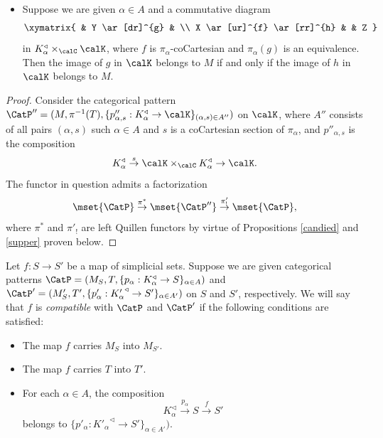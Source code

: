 \begin{theorem}
\begin{itemize}
\item[$(8)$] Suppose we are given $\alpha \in A$ and a commutative diagram
$$ \xymatrix{ & Y \ar[dr]^{g} & \\
X \ar[ur]^{f} \ar[rr]^{h} & & Z }$$
in $K_{\alpha}^{\triangleleft} \times_{\calC} \calK$, where
$f$ is $\pi_{\alpha}$-coCartesian and $\pi_{\alpha}(g)$ is an equivalence. Then the image of $g$ in $\calK$ belongs to $M$
if and only if the image of $h$ in $\calK$ belongs to $M$.
\end{itemize}
\end{theorem}

\begin{proof}
Consider the categorical pattern
$\CatP'' = (M, \pi^{-1}(T), \{ p''_{\alpha,s}: K_{\alpha}^{\triangleleft} \rightarrow \calK\}_{(\alpha,s) \in A''})$
on $\calK$, where $A''$ consists of all pairs $(\alpha, s)$ such $\alpha \in A$ and
$s$ is a coCartesian section of $\pi_{\alpha}$, and $p''_{\alpha,s}$ is the composition
$$K_{\alpha}^{\triangleleft} \stackrel{s}{\rightarrow} \calK \times_{ \calC} K_{\alpha}^{\triangleleft} \rightarrow \calK.$$
The functor in question admits a factorization
$$ \mset{\CatP} \stackrel{ \pi^{\ast}}{\rightarrow} \mset{\CatP''} \stackrel{ \pi'_{!} }{\rightarrow} \mset{\CatP},$$
where $\pi^{\ast}$ and $\pi'_{!}$ are left Quillen functors by virtue of Propositions \ref{candied} and \ref{supper} proven below.
\end{proof}

\begin{definition}
Let $f: S \rightarrow S'$ be a map of simplicial sets. Suppose we are given categorical patterns
$\CatP = (M_S, T, \{ p_{\alpha}: K_{\alpha}^{\triangleleft} \rightarrow S\}_{\alpha \in A})$ and
$\CatP' = (M_S', T', \{ p'_{\alpha}: {K'_{\alpha}}^{\triangleleft} \rightarrow S'\}_{\alpha \in A'})$
on $S$ and $S'$, respectively. We will say that $f$ is {\it compatible} with $\CatP$ and $\CatP'$ if the following conditions are satisfied:

\begin{itemize}
\item The map $f$ carries $M_S$ into $M_{S'}$.
\item The map $f$ carries $T$ into $T'$.
\item For each $\alpha \in A$, the composition
$$K_{\alpha}^{\triangleleft} \stackrel{p_{\alpha}}{\rightarrow} S \stackrel{f}{\rightarrow} S'$$
belongs to $\{ p'_{\alpha}: {K'_{\alpha}}^{\triangleleft} \rightarrow S'\}_{\alpha \in A'})$.
\end{itemize}
\end{definition}

